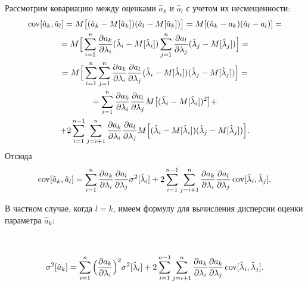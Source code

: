 Рассмотрим ковариацию между оценками $\hat{a}_k$ и $\hat{a}_l$ с учетом их несмещенности:
\begin{multline}
\mathop{\rm cov}[\hat{a}_k,\hat{a}_l]=M\big[(\hat{a}_k-M[\hat{a}_k])(\hat{a}_l-M[\hat{a}_k])\big]=M[(\hat{a}_k-a_k)(\hat{a}_l-a_l)]=
\\
=M\Big[\sum_{i=1}^n\dfrac{\partial a_k}{\partial \lambda_i}(\hat{\lambda}_i-M[\hat{\lambda}_i])\sum_{j=1}^n\dfrac{\partial a_l}{\partial \lambda_j}(\hat{\lambda}_j-M[\hat{\lambda}_j])\Big]=
\\
=M\Big[\sum_{i=1}^n\sum_{j=1}^n\dfrac{\partial a_k}{\partial \lambda_i}\dfrac{\partial a_l}{\partial \lambda_j}(\hat{\lambda}_i-M[\hat{\lambda}_i])(\hat{\lambda}_j-M[\hat{\lambda}_j])\Big]=
\\
=
\sum_{i=1}^n\dfrac{\partial a_k}{\partial \lambda_i}\dfrac{\partial a_l}{\partial \lambda_j}M\big[(\hat{\lambda}_i-M[\hat{\lambda}_i])^2\big] +\\ +2\sum_{i=1}^{n-1}\sum_{j=i+1}^n\dfrac{\partial a_k}{\partial \lambda_i}\dfrac{\partial a_l}{\partial \lambda_j}M\Big[(\hat{\lambda}_i-M[\hat{\lambda}_i])(\hat{\lambda}_j-M[\hat{\lambda}_j])\Big].
\end{multline}
Отсюда 
\begin{equation}
\mathop{\rm cov}[\hat{a}_k,\hat{a}_l]=\sum_{i=1}^n\dfrac{\partial a_k}{\partial \lambda_i}\dfrac{\partial a_l}{\partial \lambda_j}\sigma^2[\hat{\lambda}_i]+2\sum_{i=1}^{n-1}\sum_{j=i+1}^n\dfrac{\partial a_k}{\partial \lambda_i}\dfrac{\partial a_l}{\partial \lambda_j}\mathop{\rm cov}[\hat{\lambda}_i,\hat{\lambda}_j].
\label{zoteev:eq48}
\end{equation}

В частном случае, когда $l=k$, имеем формулу для вычисления дисперсии оценки параметра $\hat{a}_k$:

$\;$

\vspace{-10mm}

\begin{equation}
\sigma^2[\hat{a}_k]=\sum_{i=1}^n\Big(\dfrac{\partial a_k}{\partial \lambda_i}\Big)^2\sigma^2[\hat{\lambda}_i]+2\sum_{i=1}^{n-1}\sum_{j=i+1}^n\dfrac{\partial a_k}{\partial \lambda_i}\dfrac{\partial a_k}{\partial \lambda_j}\mathop{\rm cov}[\hat{\lambda}_i,\hat{\lambda}_j].
\label{zoteev:eq49}
\end{equation}

